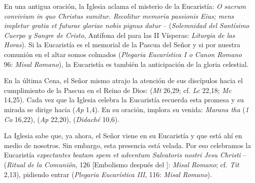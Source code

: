 \begin{ccebody}

 En una antigua oración, la Iglesia aclama el misterio de la Eucaristía: \textit{O sacrum convivium in quo Christus sumitur. Recolitur memoria passionis Eius; mens impletur gratia et futurae gloriae nobis pignus datur} –  (\textit{Solemnidad del Santísimo Cuerpo y Sangre de Cristo}, Antífona del  para las II Vísperas: \textit{Liturgia de las Horas}). Si la Eucaristía es el memorial de la Pascua del Señor y si por nuestra comunión en el altar somos colmados  (\textit{Plegaria Eucarística I o Canon Romano} 96: \textit{Misal Romano}), la Eucaristía es también la anticipación de la gloria celestial.

 En la última Cena, el Señor mismo atrajo la atención de sus discípulos hacia el cumplimiento de la Pascua en el Reino de Dios:  (\textit{Mt} 26,29; cf. \textit{Lc} 22,18; \textit{Mc} 14,25). Cada vez que la Iglesia celebra la Eucaristía recuerda esta promesa y su mirada se dirige hacia  (\textit{Ap} 1,4). En su oración, implora su venida: \textit{Marana tha} (\textit{1 Co} 16,22),  (\textit{Ap} 22,20),  (\textit{Didaché} 10,6).

 La Iglesia sabe que, ya ahora, el Señor viene en su Eucaristía y que está ahí en medio de nosotros. Sin embargo, esta presencia está velada. Por eso celebramos la Eucaristía \textit{expectantes beatam spem et adventum Salvatoris nostri Jesu Christi} –  (\textit{Ritual de la Comunión}, 126 [Embolismo después del ]: \textit{Misal Romano}; cf. \textit{Tit} 2,13), pidiendo entrar  (\textit{Plegaria Eucarística III}, 116: \textit{Misal Romano}).


\end{ccebody}
